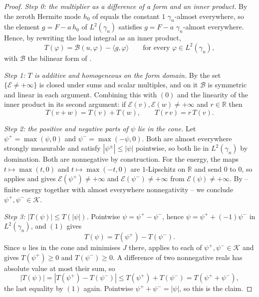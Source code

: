 \begin{proof}
\emph{Step 0: the multiplier as a difference of a form and an inner product.}
By  the zeroth Hermite mode $h_0$ of
 equals the constant $1$ $\gamma_n$-almost everywhere, so the
element $g = F - a\,h_0$ of $L^2(\gamma_n)$ satisfies $g = F - a$
$\gamma_n$-almost everywhere.  Hence, by  rewriting
the load integral as an inner product,
\begin{equation*}
  T(\varphi) = \mathcal{B}(u,\varphi) - \langle g, \varphi\rangle
  \qquad\text{for every } \varphi \in L^2(\gamma_n), \tag{0}
\end{equation*}
with $\mathcal{B}$ the bilinear form of .

\emph{Step 1: $T$ is additive and homogeneous on the form domain.}
By  the set $\{\mathcal{E} \neq +\infty\}$ is closed
under sums and scalar multiples, and on it $\mathcal{B}$ is symmetric and linear in
each argument.  Combining this with $(0)$ and the linearity of the inner product in
its second argument: if $\mathcal{E}(v), \mathcal{E}(w) \neq +\infty$ and
$r \in \mathbb{R}$ then
\begin{equation*}
  T(v+w) = T(v) + T(w), \qquad T(r\,v) = r\,T(v). \tag{1}
\end{equation*}

\emph{Step 2: the positive and negative parts of $\psi$ lie in the cone.}
Let $\psi^+ = \max(\psi,0)$ and $\psi^- = \max(-\psi,0)$.  Both are almost
everywhere strongly measurable and satisfy $|\psi^\pm| \leq |\psi|$ pointwise, so
both lie in $L^2(\gamma_n)$ by domination.  Both are nonnegative by construction.
For the energy, the maps $t \mapsto \max(t,0)$ and $t \mapsto \max(-t,0)$ are
$1$-Lipschitz on $\mathbb{R}$ and send $0$ to $0$, so 
applies and gives $\mathcal{E}(\psi^+) \neq +\infty$ and
$\mathcal{E}(\psi^-) \neq +\infty$ from $\mathcal{E}(\psi) \neq +\infty$.  By
 -- finite energy together with almost everywhere
nonnegativity -- we conclude $\psi^+, \psi^- \in \mathcal{K}$.

\emph{Step 3: $|T(\psi)| \leq T(|\psi|)$.}
Pointwise $\psi = \psi^+ - \psi^-$, hence $\psi = \psi^+ + (-1)\psi^-$ in
$L^2(\gamma_n)$, and $(1)$ gives
\[
  T(\psi) = T(\psi^+) - T(\psi^-).
\]
Since $u$ lies in the cone and minimises $J$ there, 
applies to each of $\psi^+, \psi^- \in \mathcal{K}$ and gives
$T(\psi^+) \geq 0$ and $T(\psi^-) \geq 0$.  A difference of two nonnegative reals
has absolute value at most their sum, so
\[
  |T(\psi)| = |T(\psi^+) - T(\psi^-)| \leq T(\psi^+) + T(\psi^-)
    = T(\psi^+ + \psi^-),
\]
the last equality by $(1)$ again.  Pointwise $\psi^+ + \psi^- = |\psi|$, so this
is the claim.


\end{proof}
